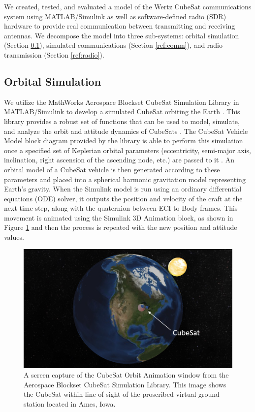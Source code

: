\documentclass[conf]{new-aiaa}
\begin{document}
We created, tested, and evaluated a model of the Wertz CubeSat communications system \cite{SMAD} using MATLAB/Simulink as well as software-defined radio (SDR) hardware to provide real communication between transmitting and receiving antennas. We decompose the model into three sub-systems: orbital simulation (Section \ref{ref:orbital}), simulated communications (Section \ref{ref:comm}), and radio transmission (Section \ref{ref:radio}). 

\subsection{Orbital Simulation}
\label{ref:orbital}

We utilize the MathWorks Aerospace Blockset CubeSat Simulation Library in MATLAB/Simulink to develop a simulated CubeSat orbiting the Earth \cite{MATLAB:2019}. This library provides a robust set of functions that can be used to model, simulate, and analyze the orbit and attitude dynamics of CubeSats \cite{AerospaceBlockset}. The CubeSat Vehicle Model block diagram provided by the library is able to perform this simulation once a specified set of Keplerian orbital parameters (eccentricity, semi-major axis, inclination, right ascension of the ascending node, etc.) are passed to it \cite{AerospaceModeling}. An orbital model of a CubeSat vehicle is then generated according to these parameters and placed into a spherical harmonic gravitation model representing Earth's gravity. When the Simulink model is run using an ordinary differential equations (ODE) solver, it outputs the position and velocity of the craft at the next time step, along with the quaternion between ECI to Body frames. This movement is animated using the Simulink 3D Animation block, as shown in Figure \ref{OrbitalAnimation} and then the process is repeated with the new position and attitude values.

\begin{figure}[!ht]
\centering
\includegraphics[width=.7\textwidth]{Fig/CubeSatModelScreenshot.png}
\caption{A screen capture of the CubeSat Orbit Animation window from the Aerospace Blockset CubeSat Simulation Library. This image shows the CubeSat within line-of-sight of the proscribed virtual ground station located in Ames, Iowa.}
\label{OrbitalAnimation}
\end{figure}
\end{document}
